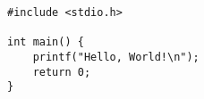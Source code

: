 \documentclass[a4paper, 10pt]{book}
\begin{document}
\begin{lstlisting}
#include <stdio.h>

int main() {
    printf("Hello, World!\n");
    return 0;
}
\end{lstlisting}
\end{document}

